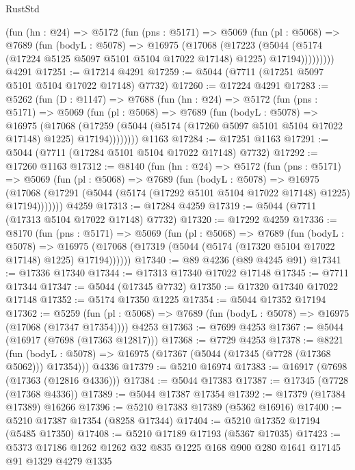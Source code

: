 \begin{lexlean}{RustStd}
\begin{coremodule}
        (fun (hn : @24) =>
        @5172
          (fun (pns : @5171) =>
          @5069
            (fun (pl : @5068) =>
            @7689
              (fun (bodyL : @5078) =>
              @16975
                (@17068
                  (@17223
                    (@5044
                      (@5174 (@17224 @5125 @5097 @5101 @5104 @17022 @17148) @1225)
                      @17194)))))))))
    @4291
@17251 := @17214 @4291
@17259 := @5044 (@7711 (@17251 @5097 @5101 @5104 @17022 @17148) @7732)
@17260 := @17224 @4291
@17283 := @5262
    (fun (D : @1147) =>
    @7688
      (fun (hn : @24) =>
      @5172
        (fun (pns : @5171) =>
        @5069
          (fun (pl : @5068) =>
          @7689
            (fun (bodyL : @5078) =>
            @16975
              (@17068
                (@17259 (@5044 (@5174 (@17260 @5097 @5101 @5104 @17022 @17148) @1225) @17194))))))))
    @1163
@17284 := @17251 @1163
@17291 := @5044 (@7711 (@17284 @5101 @5104 @17022 @17148) @7732)
@17292 := @17260 @1163
@17312 := @8140
    (fun (hn : @24) =>
    @5172
      (fun (pns : @5171) =>
      @5069
        (fun (pl : @5068) =>
        @7689
          (fun (bodyL : @5078) =>
          @16975
            (@17068 (@17291 (@5044 (@5174 (@17292 @5101 @5104 @17022 @17148) @1225) @17194)))))))
    @4259
@17313 := @17284 @4259
@17319 := @5044 (@7711 (@17313 @5104 @17022 @17148) @7732)
@17320 := @17292 @4259
@17336 := @8170
    (fun (pns : @5171) =>
    @5069
      (fun (pl : @5068) =>
      @7689
        (fun (bodyL : @5078) =>
        @16975 (@17068 (@17319 (@5044 (@5174 (@17320 @5104 @17022 @17148) @1225) @17194))))))
@17340 := @89 @4236 (@89 @4245 @91)
@17341 := @17336 @17340
@17344 := @17313 @17340 @17022 @17148
@17345 := @7711 @17344
@17347 := @5044 (@17345 @7732)
@17350 := @17320 @17340 @17022 @17148
@17352 := @5174 @17350 @1225
@17354 := @5044 @17352 @17194
@17362 := @5259
    (fun (pl : @5068) => @7689 (fun (bodyL : @5078) => @16975 (@17068 (@17347 @17354))))
    @4253
@17363 := @7699 @4253
@17367 := @5044 (@16917 (@7698 (@17363 @12817)))
@17368 := @7729 @4253
@17378 := @8221
    (fun (bodyL : @5078) => @16975 (@17367 (@5044 (@17345 (@7728 (@17368 @5062))) @17354)))
    @4336
@17379 := @5210 @16974
@17383 := @16917 (@7698 (@17363 (@12816 @4336)))
@17384 := @5044 @17383
@17387 := @17345 (@7728 (@17368 @4336))
@17389 := @5044 @17387 @17354
@17392 := @17379 (@17384 @17389) @16266
@17396 := @5210 @17383 @17389 (@5362 @16916)
@17400 := @5210 @17387 @17354 (@8258 @17344)
@17404 := @5210 @17352 @17194 (@5485 @17350)
@17408 := @5210 @17189 @17193 (@5367 @17035)
@17423 := @5373 @17186 @1262 @1262 @32 @835 @1225 @168 @900 @280 @1641 @17145 @91 @1329 @4279 @1335

\end{coremodule}
\end{lexlean}
